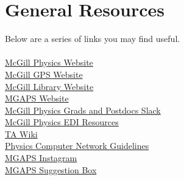 
\chapter{General Resources}

    Below are a series of links you may find useful.
    \\\\
    \href{https://www.physics.mcgill.ca/}{McGill Physics Website}
    \\
    \href{https://www.mcgill.ca/gps/}{McGill GPS Website}
    \\
    \href{https://mcgill.on.worldcat.org/discovery}{McGill Library Website}
    \\
    \href{https://mgaps.physics.mcgill.ca/}{MGAPS Website}
    \\
    \href{https://can01.safelinks.protection.outlook.com/?url=https%3A%2F%2Fjoin.slack.com%2Ft%2Fmcgillphysics-rag1431%2Fshared_invite%2Fzt-3vlrg6luf-k0KqSG3LdCQ2V2P96XF_kQ&data=05%7C02%7Cdaniel.c.jacob%40mail.mcgill.ca%7C5169cdb61fc741fe8cbb08def1a76561%7Ccd31967152e74a68afa9fcf8f89f09ea%7C0%7C0%7C639213898431335707%7CUnknown%7CTWFpbGZsb3d8eyJFbXB0eU1hcGkiOnRydWUsIlYiOiIwLjAuMDAwMCIsIlAiOiJXaW4zMiIsIkFOIjoiTWFpbCIsIldUIjoyfQ%3D%3D%7C0%7C%7C%7C&sdata=m%2BORuHODUAS9x4BDccrP8OR7tM98e5rdIjaaDU8B9Ac%3D&reserved=0}{McGill Physics Grads and Postdocs Slack}
    \\
    \href{https://www.physics.mcgill.ca/edi/resources.html}{McGill Physics EDI Resources}
    \\
    \href{https://wiki.hep.physics.mcgill.ca/TAWiki/}{TA Wiki}
    \\
    \href{https://www.physics.mcgill.ca/~francois/projects/guidelines.html}{Physics Computer Network Guidelines}
    \\
    \href{https://www.instagram.com/officialmgaps/}{MGAPS Instagram}
    \\
    \href{https://docs.google.com/forms/d/e/1FAIpQLSdPcEDf5J5YZ5VptIHB8GFWDtfcSlhB7MPIqlDOP__uiEqoPg/viewform}{MGAPS Suggestion Box}